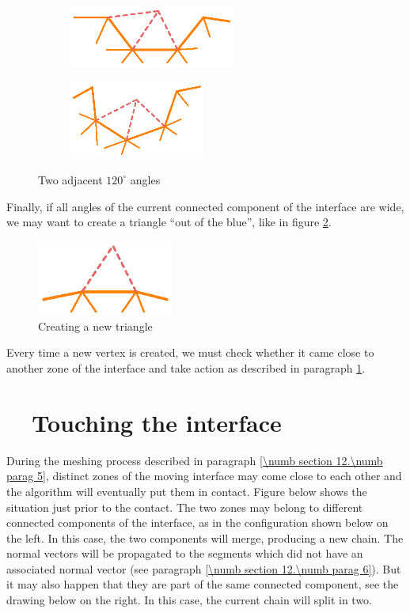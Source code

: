 \begin{figure}[ht] \centering
\begin{subfigure}{60mm}\centering
  \includegraphics[width=55mm]{fill-angle-120-a}
\end{subfigure}  
\begin{subfigure}{50mm}\centering
  \includegraphics[width=45mm]{fill-angle-120-b}
\end{subfigure}  
  \caption{Two adjacent $ 120^\circ $ angles}
  \label{\numb section 12.\numb fig 4}
\end{figure}

Finally, if all angles of the current connected component of the interface are wide,
we may want to create a triangle ``out of the blue'', like in figure
\ref{\numb section 12.\numb fig 5}.

\begin{figure}[ht] \centering
  \includegraphics[width=45mm]{fill-blue}
  \caption{Creating a new triangle}
  \label{\numb section 12.\numb fig 5}
\end{figure}

Every time a new vertex is created, we must check whether it came close to another
zone of the interface and take action as described in paragraph
\ref{\numb section 12.\numb parag 8}.


\section{~~Touching the interface}\label{\numb section 12.\numb parag 8}

During the meshing process described in paragraph \ref{\numb section 12.\numb parag 5},
distinct zones of the moving interface may
come close to each other and the algorithm will eventually put them in contact.
Figure below shows the situation just prior to the contact.
The two zones may belong to different connected components of the interface,
as in the configuration shown below on the left.
In this case, the two components will merge, producing a new chain.
The normal vectors will be propagated to the segments which did not have an associated
normal vector (see paragraph \ref{\numb section 12.\numb parag 6}).
But it may also happen that they are part of the same connected component,
see the drawing below on the right.
In this case, the current chain will split in two.

